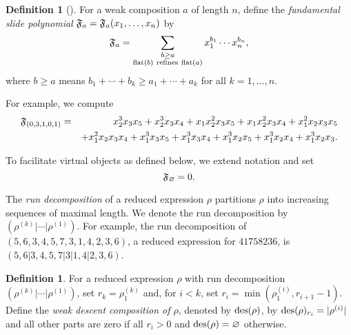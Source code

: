 \documentclass[11pt]{amsart}
\theoremstyle{definition}
\newtheorem{definition}[theorem]{Definition}
\theoremstyle{remark}
\numberwithin{equation}{section}
\newcommand{\des}{\ensuremath\mathrm{des}}
\newcommand{\fund}{\ensuremath\mathfrak{F}}
\begin{document}
\begin{definition}[\cite{AS17}]
  For a weak composition $a$ of length $n$, define the \emph{fundamental slide polynomial} $\fund_{a} = \fund_{a}(x_1,\ldots,x_n)$ by
  \begin{equation}
    \fund_{a} = \sum_{\substack{b \geq a \\ \mathrm{flat}(b) \ \mathrm{refines} \ \mathrm{flat}(a)}} x_1^{b_1} \cdots x_n^{b_n},
    \label{e:fund-shift}
  \end{equation}
  where $b \geq a$ means $b_1 + \cdots + b_k \geq a_1 + \cdots + a_k$ for all $k=1,\ldots,n$.
  \label{def:fund-shift}
\end{definition}

For example, we compute
\begin{eqnarray*}
  \fund_{(0,3,1,0,1)} & = & x_2^3 x_3 x_5 + x_2^3 x_3 x_4 + x_1 x_2^2 x_3 x_5 + x_1 x_2^2 x_3 x_4 + x_1^2x_2 x_3 x_5 \\
  & & + x_1^2x_2 x_3 x_4 + x_1^3 x_3 x_5 + x_1^3 x_3 x_4 + x_1^3 x_2 x_5 + x_1^3 x_2 x_4 + x_1^3 x_2 x_3.
\end{eqnarray*}

To facilitate virtual objects as defined below, we extend notation and set
\begin{equation}
  \fund_{\varnothing} = 0.
\end{equation}

The \emph{run decomposition} of a reduced expression $\rho$ partitions $\rho$ into increasing sequences of maximal length. We denote the run decomposition by $(\rho^{(k)} | \cdots | \rho^{(1)})$. For example, the run decomposition of $(5,6,3,4,5,7,3,1,4,2,3,6)$, a reduced expression for $41758236$, is $(5,6|3,4,5,7|3|1,4|2,3,6)$. 

\begin{definition}
  For a reduced expression $\rho$ with run decomposition $(\rho^{(k)} | \cdots | \rho^{(1)})$, set $r_k = \rho^{(k)}_1$ and, for $i<k$, set $r_i = \min(\rho^{(i)}_1,r_{i+1}-1)$. Define the \emph{weak descent composition of $\rho$}, denoted by $\des(\rho)$, by $\des(\rho)_{r_i} = |\rho^{(i)}|$ and all other parts are zero if all $r_i>0$ and $\des(\rho) = \varnothing$ otherwise.
  \label{def:des-red}
\end{definition}
\end{document}
